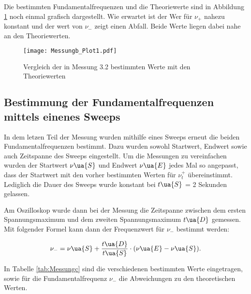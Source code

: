 Die bestimmten Fundamentalfrequenzen und die Theoriewerte sind in Abbildung \ref{fig:Messungb}
noch einmal grafisch dargestellt. Wie erwartet ist der Wer für $\nu_{+}$ nahezu
konstant und der wert von $\nu_{-}$ zeigt einen Abfall. Beide
Werte liegen dabei nahe an den Theoriewerten.

\begin{figure}
 \texttt{[image: Messungb\_Plot1.pdf]}
 \caption{Vergleich der in Messung 3.2 bestimmten Werte mit den Theoriewerten}
 \label{fig:Messungb}
\end{figure}

\newpage

\subsection{Bestimmung der Fundamentalfrequenzen mittels einenes Sweeps}

In dem letzen Teil der Messung wurden mithilfe eines Sweeps erneut die beiden
Fundamentalfrequenzen bestimmt. Dazu wurden sowohl Startwert, Endwert sowie auch
Zeitspanne des Sweeps eingestellt. Um die Messungen zu vereinfachen wurden der
Startwert $\nu\ua{S}$ und Endwert $\nu\ua{E}$ jedes Mal so angepasst, dass der
Startwert mit den vorher bestimmten Werten für $\nu_t^{+}$ übereinstimmt. Lediglich
die Dauer des Sweeps wurde konstant bei $t\ua{S}$ = 2 Sekunden gelassen.

Am Oszilloskop wurde dann bei der Messung die Zeitspanne zwischen dem ersten
Spannungsmaximum und dem zweiten Spannungsmaximum $t\ua{D}$ gemessen. Mit folgender
Formel kann dann der Frequenzwert für $\nu_{-}$ bestimmt werden:

\begin{equation}
  \nu_{-} = \nu\ua{S} + \frac{t\ua{D}}{t\ua{S}} \cdot ( \nu\ua{E} - \nu\ua{S}).
\end{equation}

In Tabelle \ref{tab:Messungc} sind die verschiedenen bestimmten Werte eingetragen, sowie für
die Fundamentalfrequenz  $\nu_{-}$ die Abweichungen zu den theoretischen Werten.

